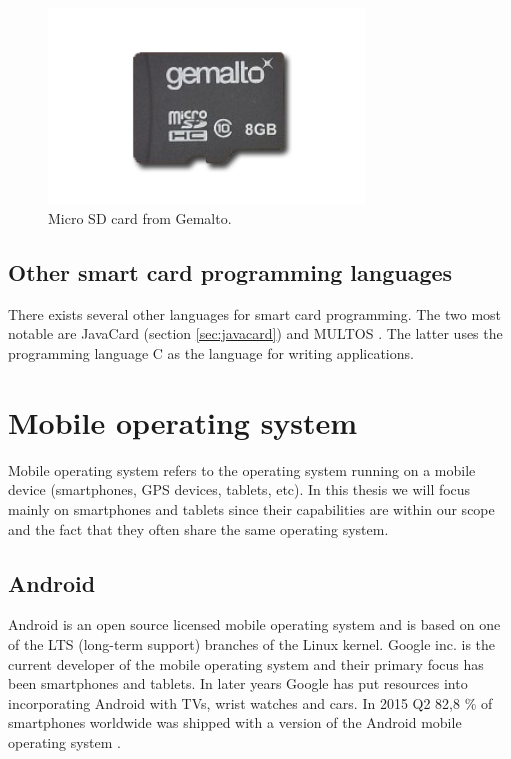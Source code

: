 \begin{figure}[h!]
  \caption{Micro SD card from Gemalto.}
  \label{fig:msdcard}
  \centering
    \includegraphics[width=0.75\textwidth]{images/msd.png}
\end{figure}

\subsection{Other smart card programming languages}
There exists several other languages for smart card programming. The two most notable are JavaCard (section \ref{sec:javacard}) and MULTOS \cite{multos}. The latter uses the programming language C as the language for writing applications.

\section{Mobile operating system}
Mobile operating system refers to the operating system running on a mobile device (smartphones, GPS devices, tablets, etc). In this thesis we will focus mainly on smartphones and tablets since their capabilities are within our scope and the fact that they often share the same operating system.

\subsection{Android}
Android is an open source licensed mobile operating system and is based on one of the LTS (long-term support) branches of the Linux kernel. Google inc. \cite{google} is the current developer of the mobile operating system and their primary focus has been smartphones and tablets. In later years Google has put resources into incorporating Android with TVs, wrist watches and cars. In 2015 Q2 82,8 \% of smartphones worldwide was shipped with a version of the Android mobile operating system \cite{androidMarketShare}.

